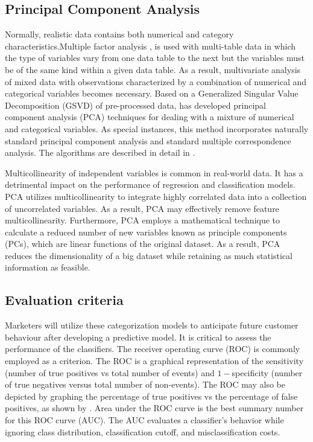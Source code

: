 \hypertarget{principal-component-analysis}{%
\subsection{Principal Component
Analysis}\label{principal-component-analysis}}

Normally, realistic data contains both numerical and category
characteristics.Multiple factor analysis \citep{Escofier1994},
\citep{Abdi2013} is used with multi-table data in which the type of
variables vary from one data table to the next but the variables must be
of the same kind within a given data table. As a result, multivariate
analysis of mixed data with observations characterized by a combination
of numerical and categorical variables becomes necessary. Based on a
Generalized Singular Value Decomposition (GSVD) of pre-processed data,
\citet{Chavent2014} has developed principal component analysis (PCA)
techniques for dealing with a mixture of numerical and categorical
variables. As special instances, this method incorporates naturally
standard principal component analysis and standard multiple
correspondence analysis. The algorithms are described in detail in
\citet{Chavent2017}.

Multicollinearity of independent variables is common in real-world data.
It has a detrimental impact on the performance of regression and
classification models. PCA utilizes multicollinearity to integrate
highly correlated data into a collection of uncorrelated variables. As a
result, PCA may effectively remove feature multicollinearity.
Furthermore, PCA employs a mathematical technique to calculate a reduced
number of new variables known as principle components (PCs), which are
linear functions of the original dataset. As a result, PCA reduces the
dimensionality of a big dataset while retaining as much statistical
information as feasible.

\hypertarget{evaluation-criteria}{%
\subsection{Evaluation criteria}\label{evaluation-criteria}}

Marketers will utilize these categorization models to anticipate future
customer behaviour after developing a predictive model. It is critical
to assess the performance of the classifiers. The receiver operating
curve (ROC) is commonly employed as a criterion. The ROC is a graphical
representation of the sensitivity (number of true positives vs total
number of events) and \(1-\)specificity (number of true negatives versus
total number of non-events). The ROC may also be depicted by graphing
the percentage of true positives vs the percentage of false positives,
as shown by \citet{Coussement2008}. Area under the ROC curve is the best
summary number for this ROC curve (AUC). The AUC evaluates a
classifier's behavior while ignoring class distribution, classification
cutoff, and misclassification costs.

